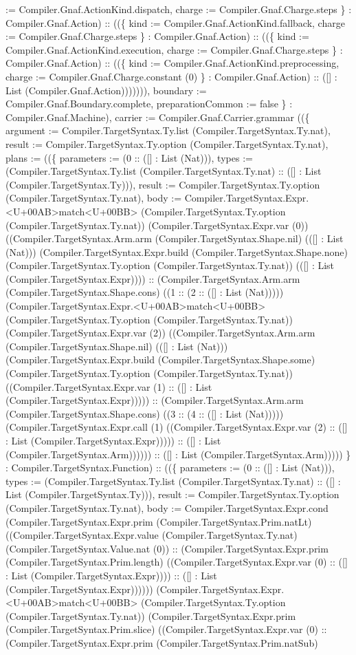 \documentclass[11pt]{article}
\begin{document}
:= Compiler.Gnaf.ActionKind.dispatch, charge := Compiler.Gnaf.Charge.steps \} : Compiler.Gnaf.Action) :: ((\{ kind := Compiler.Gnaf.ActionKind.fallback, charge := Compiler.Gnaf.Charge.steps \} : Compiler.Gnaf.Action) :: ((\{ kind := Compiler.Gnaf.ActionKind.execution, charge := Compiler.Gnaf.Charge.steps \} : Compiler.Gnaf.Action) :: ((\{ kind := Compiler.Gnaf.ActionKind.preprocessing, charge := Compiler.Gnaf.Charge.constant (0) \} : Compiler.Gnaf.Action) :: ([] : List (Compiler.Gnaf.Action))))))), boundary := Compiler.Gnaf.Boundary.complete, preparationCommon := false \} : Compiler.Gnaf.Machine), carrier := Compiler.Gnaf.Carrier.grammar ((\{ argument := Compiler.TargetSyntax.Ty.list (Compiler.TargetSyntax.Ty.nat), result := Compiler.TargetSyntax.Ty.option (Compiler.TargetSyntax.Ty.nat), plans := ((\{ parameters := (0 :: ([] : List (Nat))), types := (Compiler.TargetSyntax.Ty.list (Compiler.TargetSyntax.Ty.nat) :: ([] : List (Compiler.TargetSyntax.Ty))), result := Compiler.TargetSyntax.Ty.option (Compiler.TargetSyntax.Ty.nat), body := Compiler.TargetSyntax.Expr.<U+00AB>match<U+00BB> (Compiler.TargetSyntax.Ty.option (Compiler.TargetSyntax.Ty.nat)) (Compiler.TargetSyntax.Expr.var (0)) ((Compiler.TargetSyntax.Arm.arm (Compiler.TargetSyntax.Shape.nil) (([] : List (Nat))) (Compiler.TargetSyntax.Expr.build (Compiler.TargetSyntax.Shape.none) (Compiler.TargetSyntax.Ty.option (Compiler.TargetSyntax.Ty.nat)) (([] : List (Compiler.TargetSyntax.Expr)))) :: (Compiler.TargetSyntax.Arm.arm (Compiler.TargetSyntax.Shape.cons) ((1 :: (2 :: ([] : List (Nat))))) (Compiler.TargetSyntax.Expr.<U+00AB>match<U+00BB> (Compiler.TargetSyntax.Ty.option (Compiler.TargetSyntax.Ty.nat)) (Compiler.TargetSyntax.Expr.var (2)) ((Compiler.TargetSyntax.Arm.arm (Compiler.TargetSyntax.Shape.nil) (([] : List (Nat))) (Compiler.TargetSyntax.Expr.build (Compiler.TargetSyntax.Shape.some) (Compiler.TargetSyntax.Ty.option (Compiler.TargetSyntax.Ty.nat)) ((Compiler.TargetSyntax.Expr.var (1) :: ([] : List (Compiler.TargetSyntax.Expr))))) :: (Compiler.TargetSyntax.Arm.arm (Compiler.TargetSyntax.Shape.cons) ((3 :: (4 :: ([] : List (Nat))))) (Compiler.TargetSyntax.Expr.call (1) ((Compiler.TargetSyntax.Expr.var (2) :: ([] : List (Compiler.TargetSyntax.Expr))))) :: ([] : List (Compiler.TargetSyntax.Arm)))))) :: ([] : List (Compiler.TargetSyntax.Arm))))) \} : Compiler.TargetSyntax.Function) :: ((\{ parameters := (0 :: ([] : List (Nat))), types := (Compiler.TargetSyntax.Ty.list (Compiler.TargetSyntax.Ty.nat) :: ([] : List (Compiler.TargetSyntax.Ty))), result := Compiler.TargetSyntax.Ty.option (Compiler.TargetSyntax.Ty.nat), body := Compiler.TargetSyntax.Expr.cond (Compiler.TargetSyntax.Expr.prim (Compiler.TargetSyntax.Prim.natLt) ((Compiler.TargetSyntax.Expr.value (Compiler.TargetSyntax.Ty.nat) (Compiler.TargetSyntax.Value.nat (0)) :: (Compiler.TargetSyntax.Expr.prim (Compiler.TargetSyntax.Prim.length) ((Compiler.TargetSyntax.Expr.var (0) :: ([] : List (Compiler.TargetSyntax.Expr)))) :: ([] : List (Compiler.TargetSyntax.Expr)))))) (Compiler.TargetSyntax.Expr.<U+00AB>match<U+00BB> (Compiler.TargetSyntax.Ty.option (Compiler.TargetSyntax.Ty.nat)) (Compiler.TargetSyntax.Expr.prim (Compiler.TargetSyntax.Prim.slice) ((Compiler.TargetSyntax.Expr.var (0) :: (Compiler.TargetSyntax.Expr.prim (Compiler.TargetSyntax.Prim.natSub) 
\end{document}
